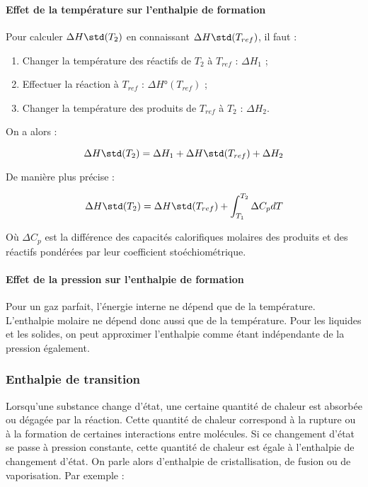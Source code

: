 \paragraph{Effet de la température sur l'enthalpie de formation}
Pour calculer $\Delta H\std (T_2)$ en connaissant $\Delta H\std (T_{ref})$,
il faut :

\begin{enumerate} 
	\item Changer la température des réactifs de $T_2$
				à $T_{ref}$ : $\Delta H_1$ ;
	\item Effectuer la réaction à $T_{ref}$ : $\Delta H°(T_{ref})$ ; 
	\item Changer la température des produits de $T_{ref}$ à $T_2$ : $\Delta H_2$.
\end{enumerate}

On a alors :

$$\Delta H\std(T_2) = \Delta H_1 + \Delta H\std(T_{ref}) + \Delta H_2$$

De manière plus précise :

$$\Delta H\std(T_2) = \Delta H\std(T_{ref}) + \int_{T_1}^{T_2} \Delta C_p dT$$

Où $\Delta C_p$ est la différence des capacités calorifiques molaires 
des produits et des réactifs pondérées par leur coefficient stoéchiométrique. 

\paragraph{Effet de la pression sur l'enthalpie de formation}
Pour un gaz parfait, l'énergie interne ne dépend que de la température.
L'enthalpie molaire ne dépend donc aussi que de la température. Pour 
les liquides et les solides, on peut approximer l'enthalpie comme étant 
indépendante de la pression également.

\subsubsection{Enthalpie de transition}
Lorsqu'une substance change d'état, une certaine quantité de chaleur
est absorbée ou dégagée par la réaction. Cette quantité de chaleur
correspond à la rupture ou à la formation de certaines interactions 
entre molécules. Si ce changement d'état se passe à pression constante,
cette quantité de chaleur est égale à l'enthalpie de changement d'état.
On parle alors d'enthalpie de cristallisation, de fusion ou de vaporisation.
Par exemple :

